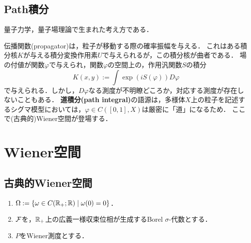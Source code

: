 \documentclass[uplatex,dvipdfmx]{jsreport}
\begin{document}
\subsection{Path積分}

\begin{tcolorbox}[colframe=ForestGreen, colback=ForestGreen!10!white,breakable,colbacktitle=ForestGreen!40!white,coltitle=black,fonttitle=\bfseries\sffamily,
title=]
    量子力学，量子場理論で生まれた考え方である．
\end{tcolorbox}

\begin{discussion}
    伝播関数(propagator)は，粒子が移動する際の確率振幅を与える．
    これはある積分核$K$が与える積分変換作用素$U$で与えられるが，この積分核が曲者である．
    場の付値が関数$\varphi$で与えられ，関数$\varphi$の空間上の，作用汎関数$S$の積分
    \[K(x,y):=\int\exp(iS(\varphi))D\varphi\]
    で与えられる．しかし，$D\varphi$なる測度が不明瞭どころか，対応する測度が存在しないこともある．
    \textbf{道積分(path integral)}の語源は，多様体$X$上の粒子を記述するシグマ模型においては，$\varphi\in C([0,1],X)$は厳密に「道」になるため．
    ここで(古典的)Wiener空間が登場する．
\end{discussion}

\section{Wiener空間}

\subsection{古典的Wiener空間}

\begin{definition}
    \begin{enumerate}
        \item $\Omega:=\left\{\omega\in C(\mathbb{R}_+;\mathbb{R})\mid\omega(0)=0\right\}$．
        \item $\mathcal{F}$を，$\mathbb{R}_+$上の広義一様収束位相が生成するBorel $\sigma$-代数とする．
        \item $P$をWiener測度とする．
    \end{enumerate}
\end{definition}
\end{document}
